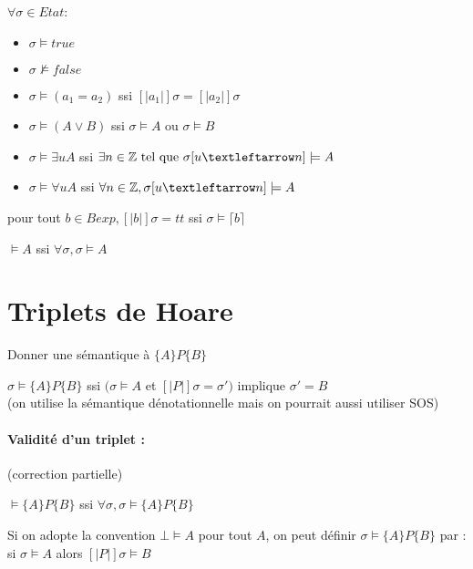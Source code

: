 \documentclass[10pt,a4paper]{article}
\newcommand{\semm}[1]{\left[| #1 | \right]}
\begin{document}
$\forall \sigma \in Etat$:
\begin{itemize}
 \item $\sigma \models true$
\item $\sigma \not \models false$
\item $\sigma \models (a_1 = a_2)$ ssi $\semm{a_1} \sigma  = \semm{a_2} \sigma  $
\item $\sigma \models (A \vee B )$ ssi $\sigma \models A$ ou $\sigma  \models B$
\item $\sigma \models \exists u A$ ssi $\exists n \in \Zs \tq \sigma[u←n] \models A$
\item $\sigma \models \forall u A$ ssi $\forall n \in \Zs, \sigma[u←n] \models A$
\end{itemize}
\begin{prop}
 pour tout $b \in Bexp, \semm{b} \sigma = tt$ ssi $\sigma \models \lceil b \rceil$
\end{prop}
\begin{definition}[tautologie]
$\models A$ ssi $\forall \sigma, \sigma \models A $
\end{definition}

\section{Triplets de Hoare}
Donner une sémantique à $\{A\}P\{B\}$

\begin{definition}
 $\sigma \models \{A\}P\{B\}$ ssi $(\sigma \models A$ et $\semm{P} \sigma = \sigma')$ implique $\sigma' = B$\\
(on utilise la sémantique dénotationnelle mais on pourrait aussi utiliser SOS)
\end{definition}

\paragraph{Validité d'un triplet :} (correction partielle)
\begin{definition}
 $\models \{A\}P\{B\}$ ssi $\forall \sigma, \sigma \models \{A\}P\{B\}$
\end{definition}
\begin{rem}
 Si on adopte la convention $\bot \models A$ pour tout $A$, on peut définir $\sigma \models \{A\}P\{B\}$ par :\\
si $\sigma \models A$ alors $\semm{P} \sigma \models B$
\end{rem}
\end{document}
